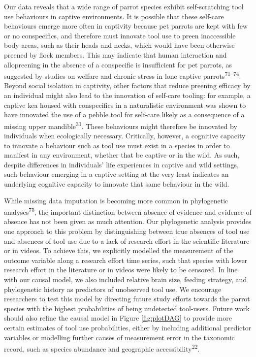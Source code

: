 \documentclass[
  man, donotrepeattitle,floatsintext]{apa6}
\begin{document}
Our data reveals that a wide range of parrot species exhibit self-scratching
tool use behaviours in captive environments. It is possible that these self-care
behaviours emerge more often in captivity because pet parrots are kept with few
or no conspecifics, and therefore must innovate tool use to preen inaccessible
body areas, such as their heads and necks, which would have been otherwise
preened by flock members. This may indicate that human interaction and
allopreening in the absence of a conspecific is insufficient for pet parrots, as
suggested by studies on welfare and chronic stress in lone captive parrots\textsuperscript{71--74}. Beyond social
isolation in captivity, other factors that reduce preening efficacy by an
individual might also lead to the innovation of self-care tooling: for example,
a captive kea housed with conspecifics in a naturalistic environment was shown
to have innovated the use of a pebble tool for self-care likely as a consequence
of a missing upper mandible\textsuperscript{31}. These behaviours might therefore be
innovated by individuals when ecologically necessary. Critically, however, a
cognitive capacity to innovate a behaviour such as tool use must exist in a
species in order to manifest in any environment, whether that be captive or in
the wild. As such, despite differences in individuals' life experiences in
captive and wild settings, such behaviour emerging in a captive setting at the
very least indicates an underlying cognitive capacity to innovate that same
behaviour in the wild.

While missing data imputation is becoming more common in phylogenetic
analyses\textsuperscript{75}, the important distinction between absence of
evidence and evidence of absence has not been given as much attention. Our
phylogenetic analysis provides one approach to this problem by distinguishing
between true absences of tool use and absences of tool use due to a lack of
research effort in the scientific literature or in videos. To achieve this, we
explicitly modelled the measurement of the outcome variable along a research
effort time series, such that species with lower research effort in the
literature or in videos were likely to be censored. In line with our causal
model, we also included relative brain size, feeding strategy, and phylogenetic
history as predictors of unobserved tool use. We encourage researchers to test
this model by directing future study efforts towards the parrot species with the
highest probabilities of being undetected tool-users. Future work should also
refine the causal model in Figure \ref{fig:plotDAG} to provide more certain
estimates of tool use probabilities, either by including additional predictor
variables or modelling further causes of measurement error in the taxonomic
record, such as species abundance and geographic accessibility\textsuperscript{22}.
\end{document}
